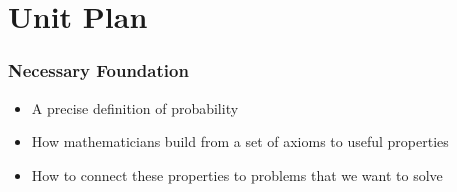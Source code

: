 \documentclass[12pt, block=fill]{beamer}
\begin{document}
\section{Unit Plan}

\begin{frame}
  \frametitle{Necessary Foundation}
  
  \begin{itemize}
  \item  A precise definition of probability
  \item  How mathematicians build from a set of axioms to useful properties
  \item How to connect these properties to problems that we want to solve
 \end{itemize}
  
\end{frame}






\end{document}
